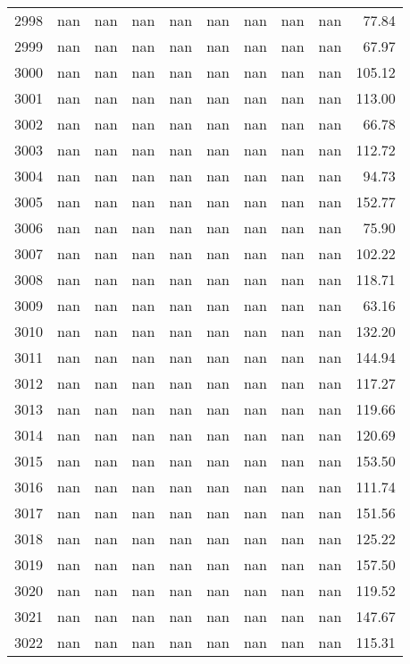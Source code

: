 \begin{tabular}{lrrrrrrrrr}
2998 & nan & nan & nan & nan & nan & nan & nan & nan & 77.84 \\
2999 & nan & nan & nan & nan & nan & nan & nan & nan & 67.97 \\
3000 & nan & nan & nan & nan & nan & nan & nan & nan & 105.12 \\
3001 & nan & nan & nan & nan & nan & nan & nan & nan & 113.00 \\
3002 & nan & nan & nan & nan & nan & nan & nan & nan & 66.78 \\
3003 & nan & nan & nan & nan & nan & nan & nan & nan & 112.72 \\
3004 & nan & nan & nan & nan & nan & nan & nan & nan & 94.73 \\
3005 & nan & nan & nan & nan & nan & nan & nan & nan & 152.77 \\
3006 & nan & nan & nan & nan & nan & nan & nan & nan & 75.90 \\
3007 & nan & nan & nan & nan & nan & nan & nan & nan & 102.22 \\
3008 & nan & nan & nan & nan & nan & nan & nan & nan & 118.71 \\
3009 & nan & nan & nan & nan & nan & nan & nan & nan & 63.16 \\
3010 & nan & nan & nan & nan & nan & nan & nan & nan & 132.20 \\
3011 & nan & nan & nan & nan & nan & nan & nan & nan & 144.94 \\
3012 & nan & nan & nan & nan & nan & nan & nan & nan & 117.27 \\
3013 & nan & nan & nan & nan & nan & nan & nan & nan & 119.66 \\
3014 & nan & nan & nan & nan & nan & nan & nan & nan & 120.69 \\
3015 & nan & nan & nan & nan & nan & nan & nan & nan & 153.50 \\
3016 & nan & nan & nan & nan & nan & nan & nan & nan & 111.74 \\
3017 & nan & nan & nan & nan & nan & nan & nan & nan & 151.56 \\
3018 & nan & nan & nan & nan & nan & nan & nan & nan & 125.22 \\
3019 & nan & nan & nan & nan & nan & nan & nan & nan & 157.50 \\
3020 & nan & nan & nan & nan & nan & nan & nan & nan & 119.52 \\
3021 & nan & nan & nan & nan & nan & nan & nan & nan & 147.67 \\
3022 & nan & nan & nan & nan & nan & nan & nan & nan & 115.31 \\

\end{tabular}

